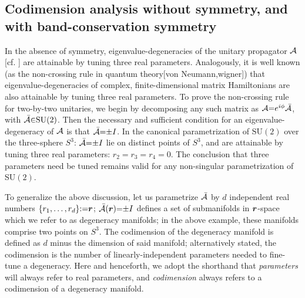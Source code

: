 \documentclass[aps, prb, showpacs, twocolumn, notitlepage, superscriptaddress]{revtex4-1}
\begin{document}


\subsection{Codimension analysis without symmetry, and with band-conservation symmetry}


In the absence of symmetry,  eigenvalue-degeneracies of the unitary propagator ${\cal A}$ [cf. ] are attainable by tuning three real parameters. Analogously, it is well known (as the non-crossing rule in quantum theory[von Neumann,wigner]) that eigenvalue-degeneracies of complex, finite-dimensional matrix Hamiltonians are also attainable by tuning three real parameters.
 To prove the non-crossing rule for two-by-two unitaries, we begin by decomposing any such matrix as ${\cal A}{=}e^{i\phi}{\cal \bar{A}}$, with  ${\cal \bar{A}}{\in}\text{SU}(2)$. Then the necessary and sufficient condition for an eigenvalue-degeneracy of ${\cal A}$ is that ${\cal \bar{A}}{=}{\pm}I$. In the canonical parametrization of $\text{SU}(2)$ over the three-sphere $S^3$: 
${\cal \bar{A}}{=}{\pm}I$ lie on distinct points of $S^3$, and are attainable by tuning three real parameters: $r_2{=}r_3{=}r_4{=}0$. The conclusion that three parameters need be tuned remains valid for any  non-singular parametrization of SU$(2)$.


 
 
 To generalize the above discussion, let us parametrize ${\cal \bar{A}}$ by $d$ independent real numbers  $\{r_1,\ldots,r_{d}\}{:}{=}\boldsymbol{r} $;  ${\cal \bar{A}}(\boldsymbol{r}){=}{\pm}I$ defines a set of submanifolds in $\boldsymbol{r}$-space which we refer to as degeneracy manifolds; in the above example, these manifolds comprise two points on $S^3$. The codimension of the degeneracy manifold  is defined as $d$ minus the dimension of said manifold; alternatively stated, the codimension is the number of linearly-independent parameters needed to fine-tune a degeneracy. Here and henceforth, we adopt the shorthand that  \textit{parameters} will always refer to real parameters, and \textit{codimension} always refers to a codimension of a degeneracy manifold. 
\end{document}
